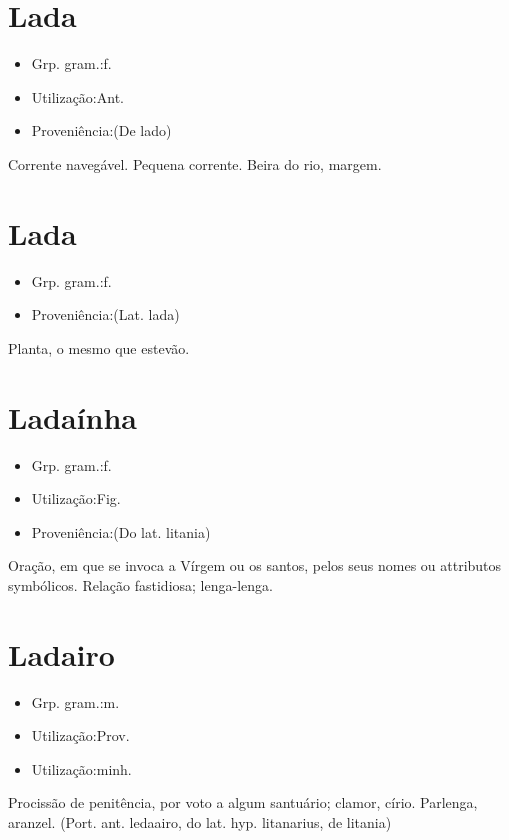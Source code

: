 \section{Lada}
\begin{itemize}
\item {Grp. gram.:f.}
\end{itemize}
\begin{itemize}
\item {Utilização:Ant.}
\end{itemize}
\begin{itemize}
\item {Proveniência:(De \textunderscore lado\textunderscore )}
\end{itemize}
Corrente navegável.
Pequena corrente.
Beira do rio, margem.
\section{Lada}
\begin{itemize}
\item {Grp. gram.:f.}
\end{itemize}
\begin{itemize}
\item {Proveniência:(Lat. \textunderscore lada\textunderscore )}
\end{itemize}
Planta, o mesmo que \textunderscore estevão\textunderscore .
\section{Ladaínha}
\begin{itemize}
\item {Grp. gram.:f.}
\end{itemize}
\begin{itemize}
\item {Utilização:Fig.}
\end{itemize}
\begin{itemize}
\item {Proveniência:(Do lat. \textunderscore litania\textunderscore )}
\end{itemize}
Oração, em que se invoca a Vírgem ou os santos, pelos seus nomes ou attributos symbólicos.
Relação fastidiosa; lenga-lenga.
\section{Ladairo}
\begin{itemize}
\item {Grp. gram.:m.}
\end{itemize}
\begin{itemize}
\item {Utilização:Prov.}
\end{itemize}
\begin{itemize}
\item {Utilização:minh.}
\end{itemize}
Procissão de penitência, por voto a algum santuário; clamor, círio.
Parlenga, aranzel.
(Port. ant. \textunderscore ledaairo\textunderscore , do lat. hyp. \textunderscore litanarius\textunderscore , de \textunderscore litania\textunderscore )
